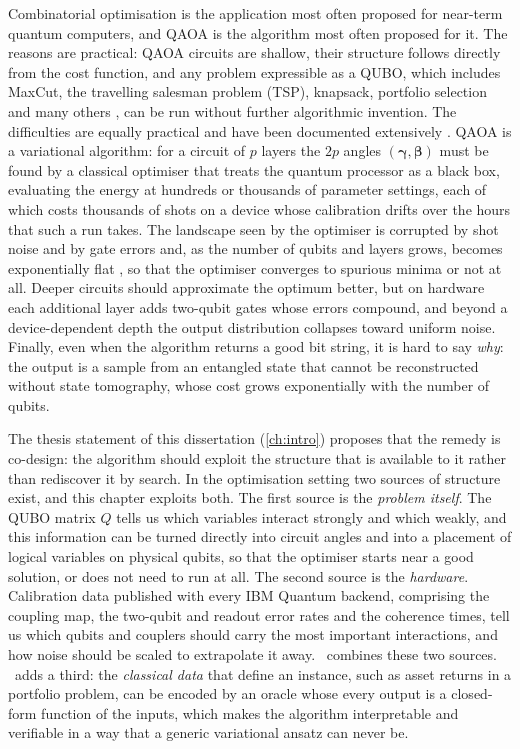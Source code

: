 Combinatorial optimisation is the application most often proposed for near-term quantum computers, and QAOA \cite{farhi2014qaoa} is the algorithm most often proposed for it. The reasons are practical: QAOA circuits are shallow, their structure follows directly from the cost function, and any problem expressible as a QUBO, which includes MaxCut, the travelling salesman problem (TSP), knapsack, portfolio selection and many others \cite{glover2018qubo}, can be run without further algorithmic invention. The difficulties are equally practical and have been documented extensively \cite{abbas2024challengesqopt,weidenfeller2022qaoascaling,cerezo2021vqa}. QAOA is a variational algorithm: for a circuit of $p$ layers the $2p$ angles $(\bm{\gamma},\bm{\beta})$ must be found by a classical optimiser that treats the quantum processor as a black box, evaluating the energy at hundreds or thousands of parameter settings, each of which costs thousands of shots on a device whose calibration drifts over the hours that such a run takes. The landscape seen by the optimiser is corrupted by shot noise and by gate errors and, as the number of qubits and layers grows, becomes exponentially flat \cite{mcclean2018barren}, so that the optimiser converges to spurious minima or not at all. Deeper circuits should approximate the optimum better, but on hardware each additional layer adds two-qubit gates whose errors compound, and beyond a device-dependent depth the output distribution collapses toward uniform noise. Finally, even when the algorithm returns a good bit string, it is hard to say \emph{why}: the output is a sample from an entangled state that cannot be reconstructed without state tomography, whose cost grows exponentially with the number of qubits.

The thesis statement of this dissertation (\cref{ch:intro}) proposes that the remedy is co-design: the algorithm should exploit the structure that is available to it rather than rediscover it by search. In the optimisation setting two sources of structure exist, and this chapter exploits both. The first source is the \emph{problem itself}. The QUBO matrix $Q$ tells us which variables interact strongly and which weakly, and this information can be turned directly into circuit angles and into a placement of logical variables on physical qubits, so that the optimiser starts near a good solution, or does not need to run at all. The second source is the \emph{hardware}. Calibration data published with every IBM Quantum backend, comprising the coupling map, the two-qubit and readout error rates and the coherence times, tell us which qubits and couplers should carry the most important interactions, and how noise should be scaled to extrapolate it away. \deal\ combines these two sources. \qawa\ adds a third: the \emph{classical data} that define an instance, such as asset returns in a portfolio problem, can be encoded by an oracle whose every output is a closed-form function of the inputs, which makes the algorithm interpretable and verifiable in a way that a generic variational ansatz can never be.

